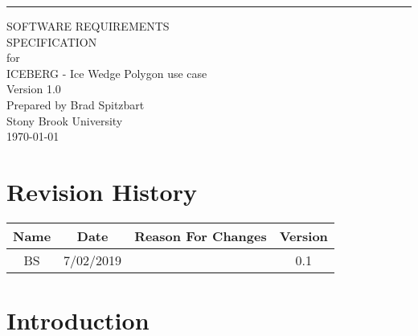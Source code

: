 \documentclass{scrreprt}
\date{}
\title{}
\def\myversion{1.0 }
\begin{document}
\begin{flushright}
    \rule{16cm}{5pt}\vskip1cm
    \begin{bfseries}
        \Huge{SOFTWARE REQUIREMENTS\\ SPECIFICATION}\\
        \vspace{1.9cm}
        for\\
        \vspace{1.9cm}
        ICEBERG - Ice Wedge Polygon use case\\
        \vspace{1.9cm}
        \LARGE{Version \myversion}\\
        \vspace{1.9cm}
        Prepared by Brad Spitzbart\\
        Stony Brook University\\
        \vspace{1.9cm}
        \today\\
    \end{bfseries}
\end{flushright}

\tableofcontents


\chapter*{Revision History}

\begin{center}
    \begin{tabular}{|c|c|c|c|}
        \hline
        Name & Date & Reason For Changes & Version\\\hline
        BS & 7/02/2019 & & 0.1\\\hline
    \end{tabular}
\end{center}


\chapter{Introduction}
\end{document}
